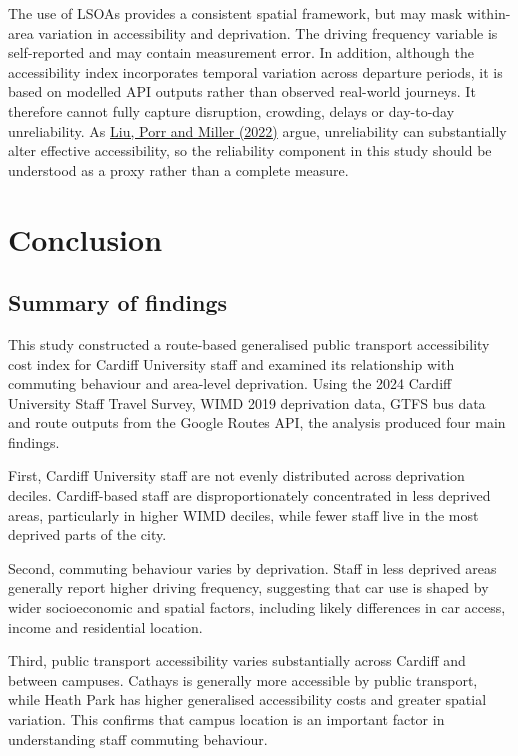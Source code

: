 \documentclass[11pt,a4paper]{article}
\newcommand{\hcite}[2]{\hyperlink{#1}{#2}}
\newcommand{\hcite}[2]{\hyperlink{#1}{#2}}
\begin{document}
The use of LSOAs provides a consistent spatial framework, but may mask within-area variation in accessibility and deprivation. The driving frequency variable is self-reported and may contain measurement error. In addition, although the accessibility index incorporates temporal variation across departure periods, it is based on modelled API outputs rather than observed real-world journeys. It therefore cannot fully capture disruption, crowding, delays or day-to-day unreliability. As \hcite{liu2022}{Liu, Porr and Miller (2022)} argue, unreliability can substantially alter effective accessibility, so the reliability component in this study should be understood as a proxy rather than a complete measure.

\section{Conclusion}

\subsection{Summary of findings}

This study constructed a route-based generalised public transport accessibility cost index for Cardiff University staff and examined its relationship with commuting behaviour and area-level deprivation. Using the 2024 Cardiff University Staff Travel Survey, WIMD 2019 deprivation data, GTFS bus data and route outputs from the Google Routes API, the analysis produced four main findings.

First, Cardiff University staff are not evenly distributed across deprivation deciles. Cardiff-based staff are disproportionately concentrated in less deprived areas, particularly in higher WIMD deciles, while fewer staff live in the most deprived parts of the city.

Second, commuting behaviour varies by deprivation. Staff in less deprived areas generally report higher driving frequency, suggesting that car use is shaped by wider socioeconomic and spatial factors, including likely differences in car access, income and residential location.

Third, public transport accessibility varies substantially across Cardiff and between campuses. Cathays is generally more accessible by public transport, while Heath Park has higher generalised accessibility costs and greater spatial variation. This confirms that campus location is an important factor in understanding staff commuting behaviour.
\end{document}
